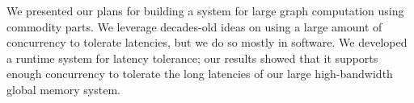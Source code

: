 \documentclass[10pt,nocopyrightspace]{sigplanconf}
\begin{document}
We presented our plans for building a system for large graph
computation using commodity parts. We leverage decades-old ideas on
using a large amount of concurrency to tolerate latencies, but we do
so mostly in software. We developed a runtime system for latency
tolerance; our results showed that it supports enough concurrency
to tolerate the long latencies of our large high-bandwidth global
memory system.

%

\renewcommand{\bibfont}{\footnotesize}  

\end{document}

